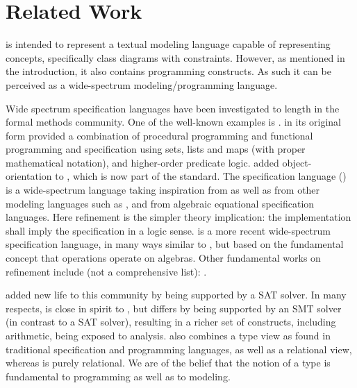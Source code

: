 
\section{Related Work}
\label{sec:related-work}

\Klang{} is intended to represent a textual modeling language capable
of representing \sysml{} concepts, specifically class diagrams with
constraints.  However, as mentioned in the introduction, it also
contains programming constructs.  As such it can be perceived as a
wide-spectrum modeling/programming language.

Wide spectrum specification languages have been investigated to length
in the formal methods community. One of the well-known examples
is \vdm{} \cite{vdm78,bjoerner-jones-82,jones90,jones-shaw-90}. \vdm{}
in its original form \cite{vdm78} provided a combination of procedural
programming and functional programming and specification using sets,
lists and maps (with proper mathematical notation), and higher-order
predicate logic. \vdmpp{} \cite{vdmplusplus05} added
object-orientation to \vdm{}, which is now part of the \vdm{}
standard. The \raiselang{} specification language (\rsl{})
\cite{raise92} is a wide-spectrum language taking inspiration from
\vdm{} as well as from other modeling languages such as \zlang{}
\cite{spivey-Z-1988}, and from algebraic equational specification
languages. Here refinement is the simpler theory implication: the implementation
shall imply the specification in a logic sense. \asml{} \cite{asml05} is a 
more recent wide-spectrum specification language, in many ways similar to \vdm{}, 
but based on the fundamental concept that operations operate on algebras. 
Other fundamental works on refinement include (not a comprehensive list): \cite{wirth-refinement-71,hoare-sanders-refinement-86,morgan-refinement-94,woodcock-sanders-z-96,back-wright-refinement-98,abrial-eventb-10}.

\alloy{} \cite{jackson-alloy-12} added new life to this community by being 
supported by a SAT solver. In many respects, \Klang{} is close in spirit 
to \alloy{}, but differs by being supported by an SMT solver (in contrast to
a SAT solver), resulting in a richer set of constructs, including arithmetic, 
being exposed to analysis. \Klang{} also combines a type view as found in 
traditional specification and programming languages, as well as a relational 
view, whereas \alloy{} is purely relational. We are of the belief that the notion
of a type is fundamental to programming as well as to modeling.

